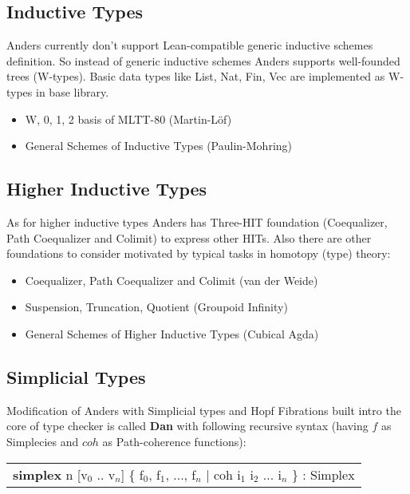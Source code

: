\documentclass[a4paper,UKenglish,cleveref, autoref, thm-restate]{lipics-v2021}
\newcommand{\tabstyle}[0]{\scriptsize\ttfamily\fontseries{l}\selectfont}
\begin{document}
\newpage
\subsection{Inductive Types}

Anders currently don’t support Lean-compatible generic inductive schemes
definition. So instead of generic inductive schemes Anders supports well-founded trees (W-types).
Basic data types like List, Nat, Fin, Vec are implemented as W-types in base library.

\begin{itemize}
\item W, 0, 1, 2 basis of MLTT-80 (Martin-L\"{o}f)
\item General Schemes of Inductive Types (Paulin-Mohring)
\end{itemize}

\subsection{Higher Inductive Types}

As for higher inductive types Anders has Three-HIT foundation (Coequalizer, Path Coequalizer and Colimit)
to express other HITs. Also there are other foundations to consider motivated by typical tasks in homotopy (type) theory:

\begin{itemize}
\item Coequalizer, Path Coequalizer and Colimit (van der Weide)
\item Suspension, Truncation, Quotient (Groupoid Infinity)
\item General Schemes of Higher Inductive Types (Cubical Agda)
\end{itemize}

\subsection{Simplicial Types}

Modification of Anders with Simplicial types and Hopf Fibrations built intro the core of type checker
is called \textbf{Dan} with following recursive syntax (having $f$ as Simplecies and $coh$ as Path-coherence functions):

\begin{table}[ht]
\tabstyle
\begin{tabular}{l}
   \textbf{simplex} n [v$_0$ .. v$_n$] \{ f$_0$, f$_1$, ..., f$_n$ | coh i$_1$ i$_2$ ... i$_n$ \} : Simplex
\end{tabular}
\end{table}
\end{document}
